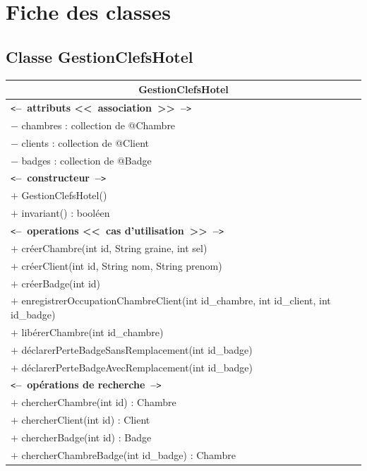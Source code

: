 \documentclass[11pt,article]{article}
\newcommand{\cmt}[1]{\texttt{<}\textbf{--~#1~--}\texttt{>}}
\begin{document}
\clearpage
\newpage

\section{Fiche des classes}

\subsection{Classe \textsf{GestionClefsHotel}}

\begin{center}
\begin{longtable}{|p{15cm}|}
\hline
\multicolumn{1}{|c|}{{\Large \textsf{GestionClefsHotel}}} \\
\hline
\cmt{attributs <<~association~>>}\\
$-$ chambres : collection de @Chambre \\
$-$ clients : collection de @Client \\
$-$ badges : collection de @Badge \\
\hline
\cmt{constructeur} \\
$+$ GestionClefsHotel()\\
$+$ invariant() : booléen\\
\cmt{operations <<~cas d'utilisation~>>} \\
$+$ créerChambre(int id, String graine, int sel) \\
$+$ créerClient(int id, String nom, String prenom) \\
$+$ créerBadge(int id) \\
$+$ enregistrerOccupationChambreClient(int id\_chambre, int id\_client, int id\_badge) \\
$+$ libérerChambre(int id\_chambre) \\
$+$ déclarerPerteBadgeSansRemplacement(int id\_badge) \\
$+$ déclarerPerteBadgeAvecRemplacement(int id\_badge) \\
\cmt{opérations de recherche} \\
$+$ chercherChambre(int id) : Chambre \\
$+$ chercherClient(int id) : Client\\
$+$ chercherBadge(int id) : Badge\\
$+$ chercherChambreBadge(int id\_badge) : Chambre \\
\hline
\end{longtable}%
\end{center}
\end{document}
